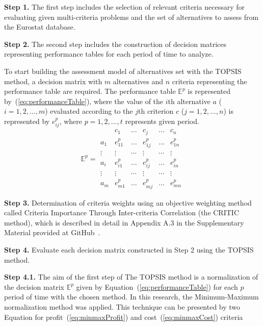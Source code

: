 \documentclass[final,5p,times,twocolumn,authoryear]{elsarticle}
\begin{document}
\textbf{Step 1.} The first step includes the selection of relevant criteria necessary for evaluating given multi-criteria problems and the set of alternatives to assess from the Eurostat database.

\textbf{Step 2.} The second step includes the construction of decision matrices representing performance tables for each period of time to analyze.

To start building the assessment model of alternatives set with the TOPSIS method, a decision matrix with $m$ alternatives and $n$ criteria representing the performance table are required. The performance table $\mathbb{E}^{p}$ is represented by~(\ref{eq:performanceTable}), where the value of the $i$th alternative $a$ ($i = 1, 2, \ldots, m$) evaluated according to the $j$th criterion $c$ ($j = 1, 2, \ldots, n$) is represented by $e_{ij}^{p}$, where $p = 1, 2, \ldots, t$ represents given period. 
\begin{equation}
    \mathbb{E}^{p} = \begin{array}{l|lllll}
     & c_{1} & \ldots & c_{j} & \ldots & c_{n} \\ \hline
    a_{1} & e_{11}^{p} & \ldots & e_{1j}^{p} & \ldots & e_{1n}^{p} \\
    \vdots & \vdots & \cdots & \vdots & \cdots & \vdots \\
    a_{i} & e_{i1}^{p} & \ldots & e_{ij}^{p} & \ldots & e_{in}^{p} \\
    \vdots & \vdots & \cdots & \vdots & \cdots & \vdots \\
    a_{m} & e_{m1}^{p} & \ldots & e_{mj}^{p} & \ldots & e_{mn}^{p} \label{eq:performanceTable}
\end{array}
\end{equation}

\textbf{Step 3.} Determination of criteria weights using an objective weighting method called Criteria Importance Through Inter-criteria Correlation (the CRITIC method), which is described in detail in Appendix A.3 in the Supplementary Material provided at GitHub~\citep{dariagithub2022}.

\textbf{Step 4.} Evaluate each decision matrix constructed in Step 2 using the TOPSIS method.

\textbf{Step 4.1.} The aim of the first step of The TOPSIS method is a normalization of the decision matrix $\mathbb{E}^{p}$ given by Equation~(\ref{eq:performanceTable}) for each $p$ period of time with the chosen method. In this research, the Minimum-Maximum normalization method was applied. This technique can be presented by two Equation for profit~(\ref{eq:minmaxProfit}) and cost~(\ref{eq:minmaxCost}) criteria
\end{document}
